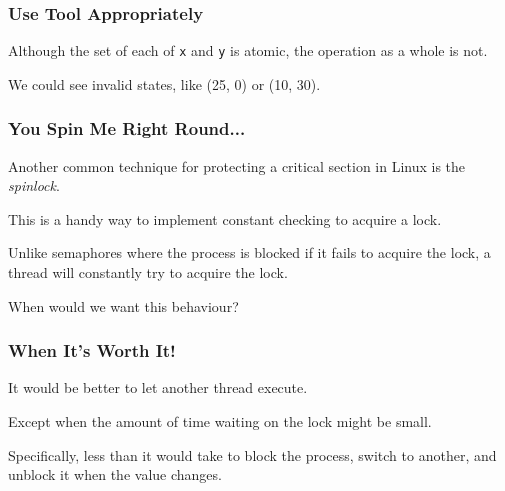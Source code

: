\begin{frame}
	\frametitle{Use Tool Appropriately}

	Although the set of each of \texttt{x} and \texttt{y} is atomic, the operation as a whole is not.

	We could see invalid states, like (25, 0) or (10, 30).
	
\end{frame}


\begin{frame}
	\frametitle{You Spin Me Right Round...}

	Another common technique for protecting a critical section in Linux is the \textit{spinlock}.

	This is a handy way to implement constant checking to acquire a lock.

	Unlike semaphores where the process is blocked if it fails to acquire the lock, a thread will constantly try to acquire the lock.

	When would we want this behaviour?

\end{frame}


\begin{frame}
	\frametitle{When It's Worth It!}

	It would be better to let another thread execute.

	Except when the amount of time waiting on the lock might be small.

	Specifically, less than it would take to block the process, switch to another, and unblock it when the value changes.


\end{frame}


